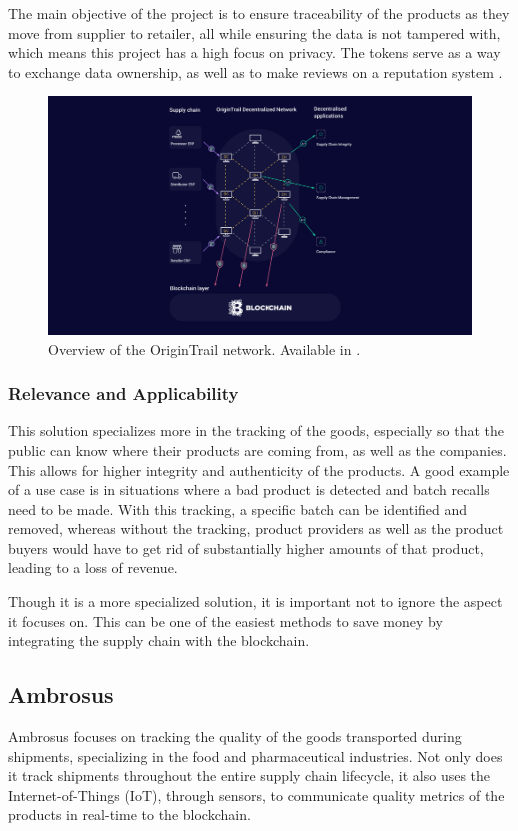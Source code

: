 The main objective of the project is to ensure traceability of the products as they move from supplier to retailer, all while ensuring the data is not tampered with, which means this project has a high focus on privacy. The tokens serve as a way to exchange data ownership, as well as to make reviews on a reputation system \cite{Rakic2017}.

\begin{figure}[h]
\centering
\includegraphics[scale=0.5]{media/origin_trail_network.jpg}
\caption[Overview of the OriginTrail network.]{Overview of the OriginTrail network. Available in \cite{OriginTrailTechno}.}
\label{fig:origintrail_network}
\end{figure}

\subsubsection{Relevance and Applicability}
This solution specializes more in the tracking of the goods, especially so that the public can know where their products are coming from, as well as the companies. This allows for higher integrity and authenticity of the products. A good example of a use case is in situations where a bad product is detected and batch recalls need to be made. With this tracking, a specific batch can be identified and removed, whereas without the tracking, product providers as well as the product buyers would have to get rid of substantially higher amounts of that product, leading to a loss of revenue.

Though it is a more specialized solution, it is important not to ignore the aspect it focuses on. This can be one of the easiest methods to save money by integrating the supply chain with the blockchain.


\subsection{Ambrosus}
Ambrosus focuses on tracking the quality of the goods transported during shipments, specializing in the food and pharmaceutical industries. Not only does it track shipments throughout the entire supply chain lifecycle, it also uses the Internet-of-Things (IoT), through sensors, to communicate quality metrics of the products in real-time to the blockchain. 

